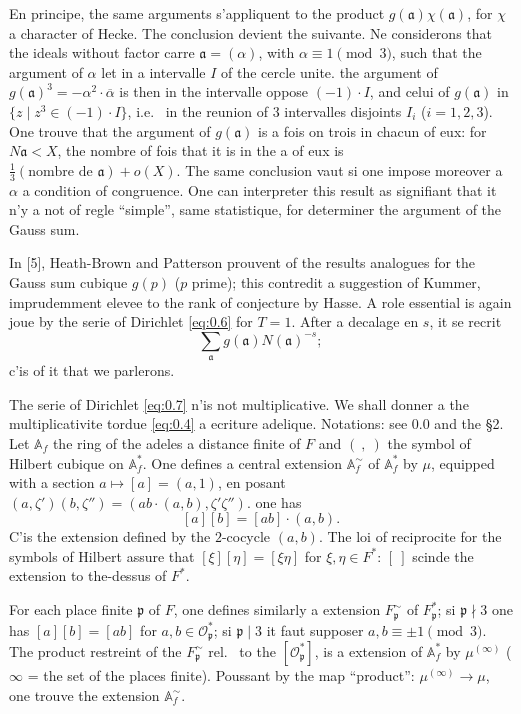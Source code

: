 \documentclass[12pt,a4paper]{article}
\theoremstyle{plain}
\theoremstyle{definition}
\theoremstyle{remark}
\newcommand{\Af}{\mathbb{A}}
\newcommand{\cO}{\mathcal{O}}
\newcommand{\frakp}{\mathfrak{p}}
\newcommand{\fraka}{\mathfrak{a}}
\providecommand{\cO}{\mathcal{O}}
\providecommand{\fraka}{\mathfrak{a}}
\providecommand{\frakp}{\mathfrak{p}}
\begin{document}
En principe, the same arguments s'appliquent to the product $g(\fraka) \chi(\fraka)$, for $\chi$ a character of Hecke. The conclusion devient the suivante. Ne considerons that the ideals without factor carre $\fraka = (\alpha)$, with $\alpha \equiv 1 \pmod 3$, such that the argument of $\alpha$ let in a intervalle $I$ of the cercle unite. the argument of $g(\fraka)^3 = -\alpha^2 \cdot \overline{\alpha}$ is then in the intervalle oppose $(-1) \cdot I$, and celui of $g(\fraka)$ in $\{z \mid z^3 \in (-1) \cdot I\}$, i.e.
\ in the reunion of $3$ intervalles disjoints $I_i$ ($i = 1, 2, 3$). One trouve that the argument of $g(\fraka)$ is a fois on trois in chacun of eux: for $N\fraka < X$, the nombre of fois that it is in the a of eux is $\frac{1}{3}(\text{nombre de } \fraka) + o(X)$. The same conclusion vaut si one impose moreover a $\alpha$ a condition of congruence. One can interpreter this result as signifiant that it n'y a not of regle ``simple'', same statistique, for determiner the argument of the Gauss sum.

In [5], Heath-Brown and Patterson prouvent of the results analogues for the Gauss sum cubique $g(p)$ ($p$ prime); this contredit a suggestion of Kummer, imprudemment elevee to the rank of conjecture by Hasse. A role essential is again joue by the serie of Dirichlet \eqref{eq:0.6} for $T = 1$. After a decalage en $s$, it se recrit
\begin{equation}\label{eq:0.7}
\sum_{\fraka} g(\fraka) N(\fraka)^{-s};
\tag{0.7}
\end{equation}
c'is of it that we parlerons.

The serie of Dirichlet \eqref{eq:0.7} n'is not multiplicative. We shall donner a the multiplicativite tordue \eqref{eq:0.4} a ecriture adelique. Notations: see 0.0 and the \S 2. Let $\Af_f$ the ring of the adeles a distance finite of $F$ and $(\ ,\ )$ the symbol of Hilbert cubique on $\Af_f^*$. One defines a central extension $\Af_f^\sim$ of $\Af_f^*$ by $\mu$, equipped with a section $a \mapsto [a] = (a, 1)$, en posant $(a, \zeta')(b, \zeta'') = (ab \cdot (a, b), \zeta' \zeta'')$. one has
\begin{equation}\label{eq:0.8}
[a][b] = [ab] \cdot (a, b).
\tag{0.8}
\end{equation}
C'is the extension defined by the $2$-cocycle $(a, b)$. The loi of reciprocite for the symbols of Hilbert assure that $[\xi][\eta] = [\xi\eta]$ for $\xi, \eta \in F^*$: $[\ ]$ scinde the extension to the-dessus of $F^*$.

For each place finite $\frakp$ of $F$, one defines similarly a extension $F_\frakp^\sim$ of $F_\frakp^*$; si $\frakp \nmid 3$ one has $[a][b] = [ab]$ for $a, b \in \cO_\frakp^*$; si $\frakp \mid 3$ it faut supposer $a, b \equiv \pm 1 \pmod 3$. The product restreint of the $F_\frakp^\sim$ rel.
\ to the $[\cO_\frakp^*]$, is a extension of $\Af_f^*$ by $\mu^{(\infty)}$ ($\infty$ = the set of the places finite). Poussant by the map ``product'': $\mu^{(\infty)} \to \mu$, one trouve the extension $\Af_f^\sim$.
\end{document}

